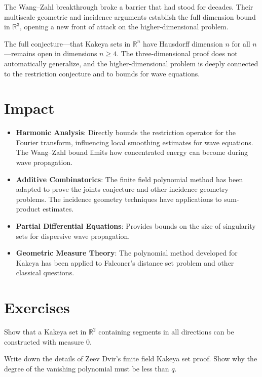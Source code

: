 The Wang--Zahl breakthrough broke a barrier that had stood for decades. Their multiscale geometric and incidence arguments establish the full dimension bound in $\mathbb{R}^3$, opening a new front of attack on the higher-dimensional problem.

The full conjecture---that Kakeya sets in $\mathbb{R}^n$ have Hausdorff dimension $n$ for all $n$---remains open in dimensions $n\geq4$. The three-dimensional proof does not automatically generalize, and the higher-dimensional problem is deeply connected to the restriction conjecture and to bounds for wave equations.

\section{Impact}
\begin{itemize}
\item \textbf{Harmonic Analysis}: Directly bounds the restriction operator for the Fourier transform, influencing local smoothing estimates for wave equations. The Wang--Zahl bound limits how concentrated energy can become during wave propagation.
\item \textbf{Additive Combinatorics}: The finite field polynomial method has been adapted to prove the joints conjecture and other incidence geometry problems. The incidence geometry techniques have applications to sum-product estimates.
\item \textbf{Partial Differential Equations}: Provides bounds on the size of singularity sets for dispersive wave propagation.
\item \textbf{Geometric Measure Theory}: The polynomial method developed for Kakeya has been applied to Falconer's distance set problem and other classical questions.
\end{itemize}

\section{Exercises}

\begin{exercise}[Basic]
Show that a Kakeya set in $\mathbb{R}^2$ containing segments in all directions can be constructed with measure 0.
\end{exercise}

\begin{exercise}[Intermediate]
Write down the details of Zeev Dvir's finite field Kakeya set proof. Show why the degree of the vanishing polynomial must be less than $q$.
\end{exercise}

